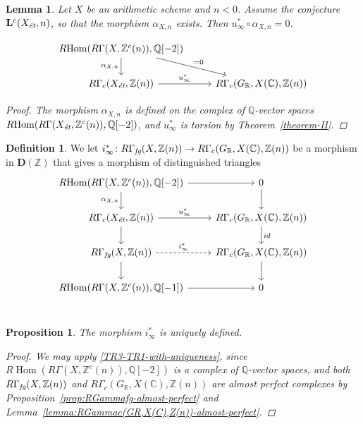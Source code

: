 \documentclass{article}
\DeclareMathOperator{\Hom}{Hom}
\newcommand{\CC}{\mathbb{C}}
\newcommand{\QQ}{\mathbb{Q}}
\newcommand{\RR}{\mathbb{R}}
\newcommand{\ZZ}{\mathbb{Z}}
\newcommand{\et}{\text{\it ét}}
\newcommand{\fg}{\text{\it fg}}
\newcommand{\RHom}{R\!\Hom}
\newtheorem{proposition}[theorem]{Proposition}
\newtheorem{lemma}[theorem]{Lemma}
\theoremstyle{definition}
\newtheorem{definition}[theorem]{Definition}
\numberwithin{equation}{section}
\begin{document}
\begin{lemma}
  Let $X$ be an arithmetic scheme and $n < 0$. Assume the conjecture
  $\mathbf{L}^c (X_\et, n)$, so that the morphism $\alpha_{X,n}$ exists.
  Then $u_\infty^* \circ \alpha_{X,n} = 0$.

  \[ \begin{tikzcd}
    \RHom (R\Gamma (X, \ZZ^c (n)), \QQ [-2]) \ar{d}[swap]{\alpha_{X,n}}\ar{dr}{= 0} \\
      R\Gamma_c (X_\et, \ZZ (n)) \ar{r}{u_\infty^*} & R\Gamma_c (G_\RR, X (\CC), \ZZ (n))
    \end{tikzcd} \]

  \begin{proof}
    The morphism $\alpha_{X,n}$ is defined on the complex of $\QQ$-vector spaces
    $\RHom (R\Gamma (X_\et, \ZZ^c (n)), \QQ [-2])$, and $u_\infty^*$ is torsion
    by Theorem~\ref{theorem-II}.
  \end{proof}
\end{lemma}

\begin{definition}
  We let
  $i_\infty^*\colon R\Gamma_\fg (X, \ZZ (n)) \to R\Gamma_c (G_\RR, X (\CC), \ZZ (n))$
  be a morphism in $\mathbf{D} (\ZZ)$ that gives a morphism of distinguished
  triangles
  \begin{equation}
    \label{eqn:triangle-defining-i-infty}
    \begin{tikzcd}
      \RHom (R\Gamma (X, \ZZ^c (n)), \QQ [-2]) \ar{d}[swap]{\alpha_{X,n}}\ar{r} & 0\ar{d} \\
      R\Gamma_c (X_\et, \ZZ (n)) \ar{r}{u_\infty^*}\ar{d} &  R\Gamma_c (G_\RR, X (\CC), \ZZ (n)) \ar{d}{id} \\
      R\Gamma_\fg (X, \ZZ (n)) \ar[dashed]{r}{i_\infty^*}\ar{d} & R\Gamma_c (G_\RR, X (\CC), \ZZ (n)) \ar{d} \\
      \RHom (R\Gamma (X, \ZZ^c (n)), \QQ [-1])\ar{r} & 0 \\
    \end{tikzcd}
  \end{equation}
\end{definition}

\begin{proposition}
  \label{prop:uniqueness-of-i-infty}
  The morphism $i_\infty^*$ is uniquely defined.

  \begin{proof}
    We may apply \ref{TR3-TR1-with-uniqueness}, since
    $\RHom (R\Gamma (X, \ZZ^c (n)), \QQ [-2])$ is a complex of $\QQ$-vector
    spaces, and both
    $R\Gamma_\fg (X, \ZZ (n))$ and
    $R\Gamma_c (G_\RR, X (\CC), \ZZ (n))$
    are almost perfect complexes by
    Proposition~\ref{prop:RGammafg-almost-perfect} and
    Lemma~\ref{lemma:RGammac(GR,X(C),Z(n))-almost-perfect}.
  \end{proof}
\end{proposition}
\end{document}
